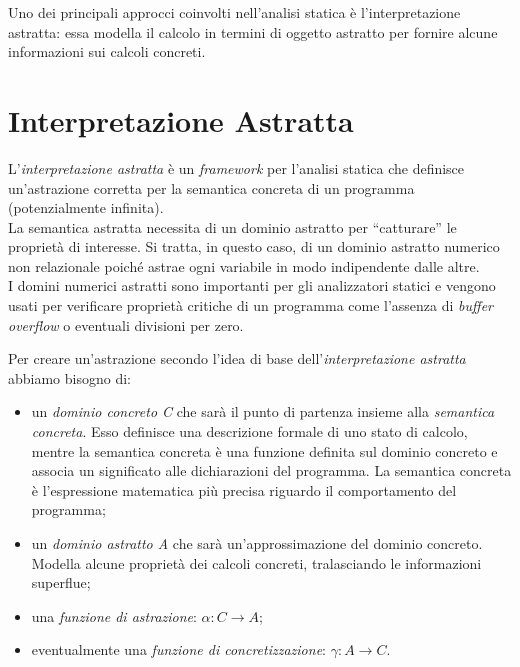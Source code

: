 \documentclass[a4paper, 10pt]{report}
\begin{document}
\noindent
Uno dei principali approcci coinvolti nell'analisi statica è l'interpretazione astratta: essa modella il calcolo in termini di oggetto astratto per fornire alcune informazioni sui calcoli concreti.

\section*{Interpretazione Astratta}
L’\textit{interpretazione astratta} è un \textit{framework} per l’analisi statica che definisce un’astrazione corretta per la semantica concreta di un programma (potenzialmente infinita).
\\
La semantica astratta necessita di un dominio astratto per “catturare” le proprietà di interesse. Si tratta, in questo caso, di un dominio astratto numerico non relazionale poiché astrae ogni variabile in modo indipendente dalle altre.
\\
I domini numerici astratti sono importanti per gli analizzatori statici e vengono usati per verificare proprietà critiche di un programma come l'assenza di \textit{buffer overflow} o eventuali divisioni per zero.
\newline

\noindent
Per creare un'astrazione secondo l'idea di base dell'\textit{interpretazione astratta} abbiamo bisogno di:
\begin{itemize}
	\item un \textit{dominio concreto C} che sarà il punto di partenza insieme alla \textit{semantica concreta}. Esso definisce una descrizione formale di uno stato di calcolo, mentre la semantica concreta è una funzione definita sul dominio concreto e associa un significato alle dichiarazioni del programma. La semantica concreta è l'espressione matematica più precisa riguardo il comportamento del programma;
	\item un \textit{dominio astratto A} che sarà un'approssimazione del dominio concreto. Modella alcune proprietà dei calcoli concreti, tralasciando le informazioni superflue;
	\item una \textit{funzione di astrazione}: $\alpha: C \rightarrow A$;
	\item eventualmente una \textit{funzione di concretizzazione}: $\gamma: A \rightarrow C$.
\end{itemize}
\end{document}

